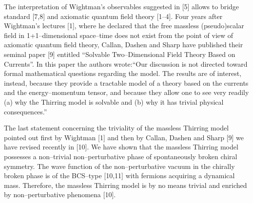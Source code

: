 \documentclass[a4paper,12pt] {article}
\begin{document}
The interpretation of Wightman's observables suggested in [5] allows
to bridge standard [7,8] and axiomatic quantum field theory
[1--4]. Four years after Wightman's lectures [1], where he declared
that the free massless (pseudo)scalar field \coordHE{} in
1+1--dimensional space--time does not exist from the point of view of
axiomatic quantum field theory,  Callan, Dashen and Sharp have
published their seminal paper [9] entitled ``Solvable Two--Dimensional
Field Theory Based on Currents''. In this paper the authors
wrote:``Our discussion is not directed toward formal mathematical
questions regarding the model. The results are of interest, instead,
because they provide a tractable model of a theory based on the
currents and the energy--momentum tensor, and because they allow one
to see very readily (a) why the Thirring model is solvable and (b) why
it has trivial physical consequences.''

The last statement concerning the triviality of the massless Thirring
model pointed out first by Wightman [1] and then by Callan, Dashen and
Sharp [9] we have revised recently in [10]. We have shown that the
massless Thirring model possesses a non--trivial non--perturbative
phase of spontaneously broken chiral symmetry. The wave function of
the non--perturbative vacuum in the chirally broken phase is of the
BCS--type [10,11] with fermions acquiring a dynamical mass. Therefore,
the massless Thirring model is by no means trivial and enriched by
non--perturbative phenomena [10].
\end{document}
